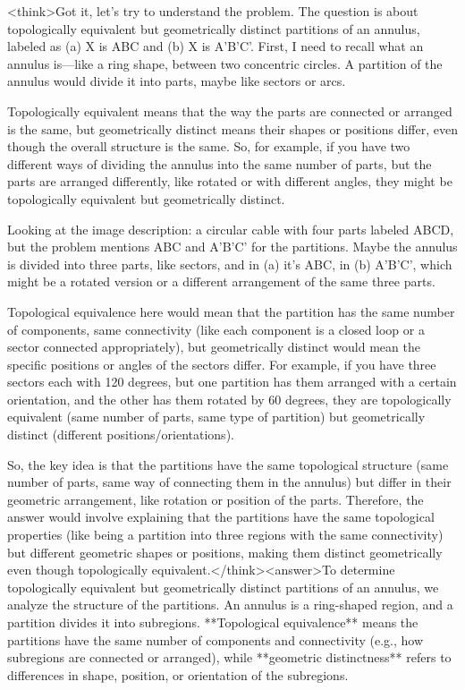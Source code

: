 <think>Got it, let's try to understand the problem. The question is about topologically equivalent but geometrically distinct partitions of an annulus, labeled as (a) X is ABC and (b) X is A'B'C'. First, I need to recall what an annulus is—like a ring shape, between two concentric circles. A partition of the annulus would divide it into parts, maybe like sectors or arcs. 

Topologically equivalent means that the way the parts are connected or arranged is the same, but geometrically distinct means their shapes or positions differ, even though the overall structure is the same. So, for example, if you have two different ways of dividing the annulus into the same number of parts, but the parts are arranged differently, like rotated or with different angles, they might be topologically equivalent but geometrically distinct.

Looking at the image description: a circular cable with four parts labeled ABCD, but the problem mentions ABC and A'B'C' for the partitions. Maybe the annulus is divided into three parts, like sectors, and in (a) it's ABC, in (b) A'B'C', which might be a rotated version or a different arrangement of the same three parts. 

Topological equivalence here would mean that the partition has the same number of components, same connectivity (like each component is a closed loop or a sector connected appropriately), but geometrically distinct would mean the specific positions or angles of the sectors differ. For example, if you have three sectors each with 120 degrees, but one partition has them arranged with a certain orientation, and the other has them rotated by 60 degrees, they are topologically equivalent (same number of parts, same type of partition) but geometrically distinct (different positions/orientations).

So, the key idea is that the partitions have the same topological structure (same number of parts, same way of connecting them in the annulus) but differ in their geometric arrangement, like rotation or position of the parts. Therefore, the answer would involve explaining that the partitions have the same topological properties (like being a partition into three regions with the same connectivity) but different geometric shapes or positions, making them distinct geometrically even though topologically equivalent.</think><answer>To determine topologically equivalent but geometrically distinct partitions of an annulus, we analyze the structure of the partitions. An annulus is a ring-shaped region, and a partition divides it into subregions. **Topological equivalence** means the partitions have the same number of components and connectivity (e.g., how subregions are connected or arranged), while **geometric distinctness** refers to differences in shape, position, or orientation of the subregions.  

